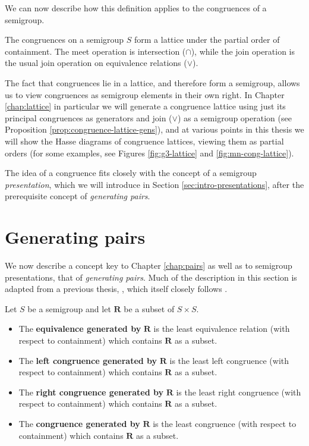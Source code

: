 We can now describe how this definition applies to the congruences of a
semigroup.

\begin{proposition}
  \label{prop:cong-lattice}
  The congruences on a semigroup $S$ form a lattice under the partial order of
  containment.  The meet operation is intersection ($\cap$), while the join
  operation is the usual join operation on equivalence relations ($\vee$).
\end{proposition}

The fact that congruences lie in a lattice, and therefore form a semigroup,
allows us to view congruences as semigroup elements
in their own right.  In Chapter \ref{chap:lattice} in particular we will
generate a congruence lattice using just its principal congruences as generators
and join ($\vee$) as a semigroup operation (see Proposition
\ref{prop:congruence-lattice-gens}), and at various points in this thesis
we will show the Hasse diagrams of congruence lattices, viewing them as partial
orders (for some examples, see Figures \ref{fig:g3-lattice} and
\ref{fig:mn-cong-lattice}).

The idea of a congruence fits closely with the concept of a semigroup
\textit{presentation}, which we will introduce in Section
\ref{sec:intro-presentations}, after the prerequisite concept of
\textit{generating pairs}.

\section{Generating pairs}
\label{sec:intro-gen-pairs}

We now describe a concept key to Chapter \ref{chap:pairs} as well as to
semigroup presentations, that of \textit{generating pairs}.  Much of the
description in this section is adapted from a previous thesis,
\cite{mtorpey_msc}, which itself closely follows \cite[\S1.4--1.5]{howie}.

\begin{definition}
  \label{def:gen-pairs}
  Let $S$ be a semigroup and let $\mathbf{R}$ be a subset of $S \times S$.
  \begin{itemize}
  \item The \textbf{equivalence generated by} $\mathbf{R}$ is the least
    equivalence relation (with respect to containment) which contains
    $\mathbf{R}$ as a subset.
  \item The \textbf{left congruence generated by} $\mathbf{R}$ is the least left
    congruence (with respect to containment) which contains $\mathbf{R}$ as a
    subset.
  \item The \textbf{right congruence generated by} $\mathbf{R}$ is the least
    right congruence (with respect to containment) which contains $\mathbf{R}$
    as a subset.
  \item The \textbf{congruence generated by} $\mathbf{R}$ is the least
    congruence (with respect to containment) which contains $\mathbf{R}$ as a
    subset.
  \end{itemize}
\end{definition}


